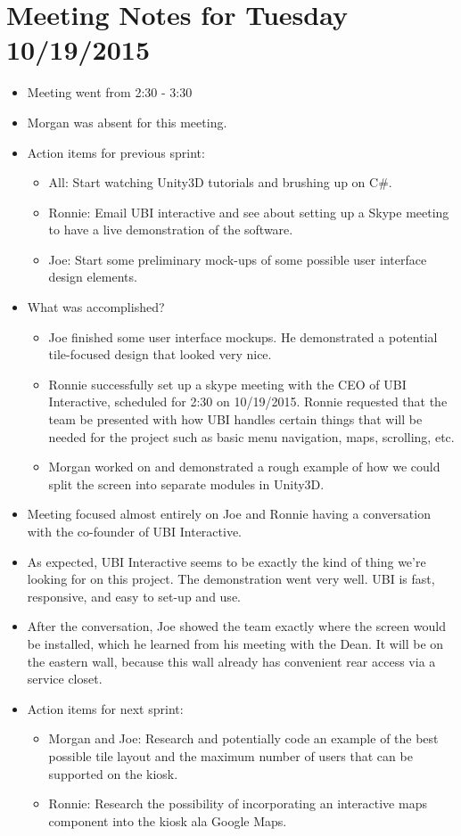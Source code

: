 \documentclass[]{article}
\begin{document}
\section{Meeting Notes for Tuesday 10/19/2015}
\begin{itemize}
	\item Meeting went from 2:30 - 3:30
	\item Morgan was absent for this meeting.
	\item Action items for previous sprint:
		\begin{itemize}
			\item All: Start watching Unity3D tutorials and brushing up on C\#.
			\item Ronnie: Email UBI interactive and see about setting up a Skype meeting to have a live demonstration of the software.
			\item Joe: Start some preliminary mock-ups of some possible user interface design elements. 
		\end{itemize}
	\item What was accomplished?
		\begin{itemize}
			\item Joe finished some user interface mockups. He demonstrated a potential tile-focused design that looked very nice. 
			\item Ronnie successfully set up a skype meeting with the CEO of UBI Interactive, scheduled for 2:30 on 10/19/2015. Ronnie requested that the team be presented with how UBI handles certain things that will be needed for the project such as basic menu navigation, maps, scrolling, etc. 
			\item Morgan worked on and demonstrated a rough example of how we could split the screen into separate modules in Unity3D. 
		\end{itemize}
	\item Meeting focused almost entirely on Joe and Ronnie having a conversation with the co-founder of UBI Interactive. 	
	\item As expected, UBI Interactive seems to be exactly the kind of thing we're looking for on this project. The demonstration went very well. UBI is fast, responsive, and easy to set-up and use. 
	\item After the conversation, Joe showed the team exactly where the screen would be installed, which he learned from his meeting with the Dean. It will be on the eastern wall, because this wall already has convenient rear access via a service closet. 
	\item Action items for next sprint:
		\begin{itemize}
			\item Morgan and Joe: Research and potentially code an example of the best possible tile layout and the maximum number of users that can be supported on the kiosk.
			\item Ronnie: Research the possibility of incorporating an interactive maps component into the kiosk ala Google Maps.
		\end{itemize}
\end{itemize}
\end{document}
